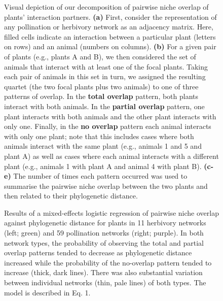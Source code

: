 \documentclass[12pt]{article}
\begin{document}
  \begin{figure}[!h]
    \begin{center}
    \end{center}
     \caption{Visual depiction of our decomposition of pairwise niche overlap of plants' interaction
     partners. \textbf{(a)} First, consider the representation of any pollination or herbivory network
     as an adjacency matrix. Here, filled cells indicate an interaction between a particular plant 
     (letters on rows) and an animal (numbers on columns). \textbf{(b)} For a given pair of plants (e.g., plants 
     A and B), we then considered the set of animals that interact with at least one of the focal
     plants. Taking each pair of animals in this set in turn, we assigned the resulting quartet (the
     two focal plants plus two animals) to one of three patterns of overlap.
     In the \textbf{total overlap} pattern, both plants interact with both animals. 
     In the \textbf{partial overlap} pattern, one plant interacts with both animals and the other plant
     interacts with only one.
     Finally, in the \textbf{no overlap} pattern each animal interacts with only one plant; note that 
     this includes cases where both animals interact with the same plant (e.g., animals 1 and 5 and plant A)
     as well as cases where each animal interacts with a different plant (e.g., animals 1 with plant A and animal
     4 with plant B). \textbf{(c-e)} The number of times each pattern occurred was used to summarise the pairwise niche 
     overlap between the two plants and then related to their phylogenetic distance.}
    \label{overlap_patterns}
  \end{figure}


  \begin{figure}[!h]
    \begin{center}
    \end{center}
     \caption{Results of a mixed-effects logistic regression of pairwise niche overlap
     against phylogenetic distance for plants in 11
     herbivory networks (left; green) and 59 pollination
     networks (right; purple). In both network types, the probability of
     observing the total and partial overlap patterns tended to
     decrease as phylogenetic distance increased while the 
     probability of the no-overlap pattern tended to increase
     (thick, dark lines). There was also substantial variation
     between individual networks (thin, pale lines) of both types.
     The model is described in Eq. 1.}
    \label{within_network_regression}
  \end{figure}
\end{document}
